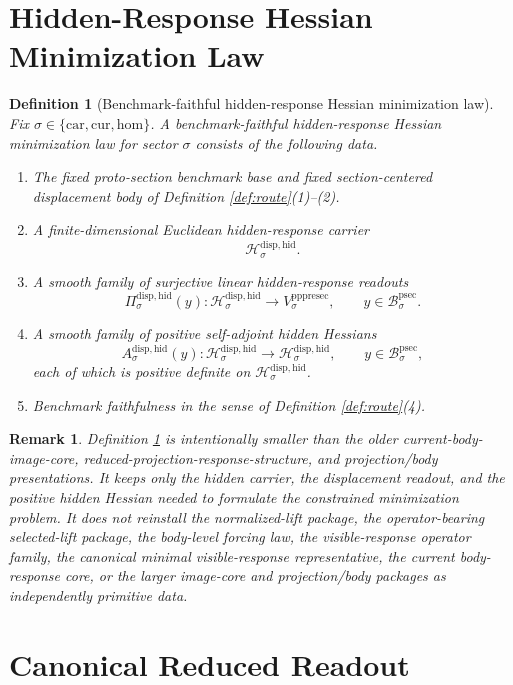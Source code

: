 \documentclass[11pt]{article}
\newcommand{\Car}{\mathrm{car}}
\newcommand{\Cur}{\mathrm{cur}}
\newcommand{\Hom}{\mathrm{hom}}
\newcommand{\ProtoSectionBody}[1]{\mathcal B_{#1}^{\mathrm{psec}}}
\newcommand{\PrePreProtoSectionVertical}[1]{V_{#1}^{\mathrm{pppresec}}}
\newcommand{\HiddenCarrier}[1]{\mathcal H_{#1}^{\mathrm{disp,hid}}}
\newcommand{\HiddenReadout}[1]{\Pi_{#1}^{\mathrm{disp,hid}}}
\newcommand{\HiddenHessian}[1]{A_{#1}^{\mathrm{disp,hid}}}
\newtheorem{definition}{Definition}
\newtheorem{remark}{Remark}
\begin{document}
\section{Hidden-Response Hessian Minimization Law}

\begin{definition}[Benchmark-faithful hidden-response Hessian minimization law]
\label{def:hidden}
Fix \(\sigma\in\{\Car,\Cur,\Hom\}\). A \emph{benchmark-faithful hidden-response Hessian minimization law} for sector \(\sigma\) consists of the following data.
\begin{enumerate}
    \item The fixed proto-section benchmark base and fixed section-centered displacement body of Definition \ref{def:route}(1)--(2).
    \item A finite-dimensional Euclidean hidden-response carrier
    \[
    \HiddenCarrier{\sigma}.
    \]
    \item A smooth family of surjective linear hidden-response readouts
    \[
    \HiddenReadout{\sigma}(y):
    \HiddenCarrier{\sigma}\to\PrePreProtoSectionVertical{\sigma},
    \qquad
    y\in\ProtoSectionBody{\sigma}.
    \]
    \item A smooth family of positive self-adjoint hidden Hessians
    \[
    \HiddenHessian{\sigma}(y):
    \HiddenCarrier{\sigma}\to\HiddenCarrier{\sigma},
    \qquad
    y\in\ProtoSectionBody{\sigma},
    \]
    each of which is positive definite on \(\HiddenCarrier{\sigma}\).
    \item Benchmark faithfulness in the sense of Definition \ref{def:route}(4).
\end{enumerate}
\end{definition}

\begin{remark}
Definition \ref{def:hidden} is intentionally smaller than the older current-body-image-core, reduced-projection-response-structure, and projection/body presentations. It keeps only the hidden carrier, the displacement readout, and the positive hidden Hessian needed to formulate the constrained minimization problem. It does not reinstall the normalized-lift package, the operator-bearing selected-lift package, the body-level forcing law, the visible-response operator family, the canonical minimal visible-response representative, the current body-response core, or the larger image-core and projection/body packages as independently primitive data.
\end{remark}

\section{Canonical Reduced Readout}
\end{document}
